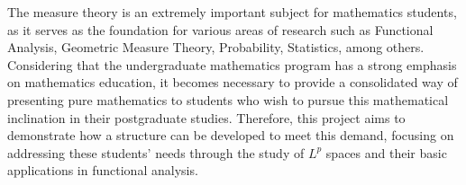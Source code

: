 The measure theory is an extremely important subject for mathematics students, as it serves as the foundation for various areas of research such as Functional Analysis, Geometric Measure Theory, Probability, Statistics, among others. Considering that the undergraduate mathematics program has a strong emphasis on mathematics education, it becomes necessary to provide a consolidated way of presenting pure mathematics to students who wish to pursue this mathematical inclination in their postgraduate studies. Therefore, this project aims to demonstrate how a structure can be developed to meet this demand, focusing on addressing these students' needs through the study of $L^p$ spaces and their basic applications in functional analysis.



